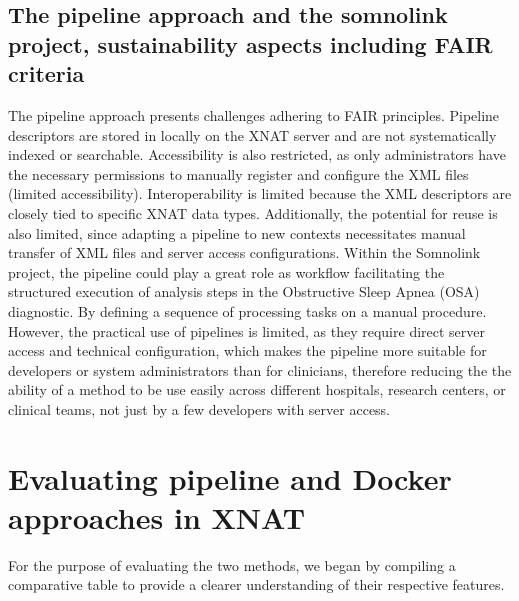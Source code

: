 \subsection{The pipeline approach and the somnolink project, sustainability aspects including FAIR criteria}
The pipeline approach presents challenges adhering to FAIR principles.
Pipeline descriptors are stored in locally on the XNAT server and are not systematically indexed or searchable.
 Accessibility is also restricted, as only administrators have the necessary permissions to manually register and configure the XML files (limited accessibility).
 Interoperability is limited because the XML descriptors are closely tied to specific XNAT data types. Additionally, the potential for reuse is also limited, since adapting a pipeline to new contexts necessitates manual transfer of XML files and server access configurations. Within the Somnolink project, the pipeline could play a great role as workflow  facilitating the structured execution of analysis steps in the Obstructive Sleep Apnea (OSA) diagnostic. By defining a sequence of processing tasks on a manual procedure. However, the practical use of pipelines is limited, as they require direct server access and technical configuration, which makes the pipeline more suitable for developers or system administrators than for clinicians, therefore reducing the the ability of a method to be use easily across different hospitals, research centers, or clinical teams, not just by a few developers with server access.


\section{Evaluating pipeline and Docker approaches in XNAT}

For the purpose of evaluating the two methods, we began by compiling a comparative table to provide a clearer understanding of their respective features.

